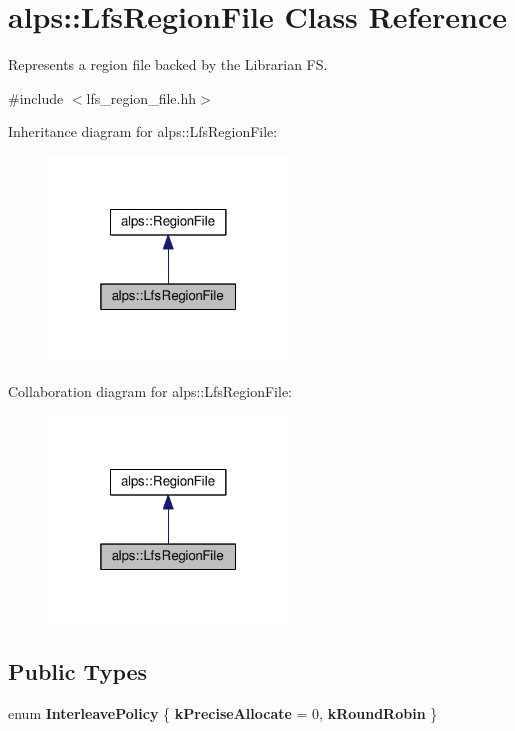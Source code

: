 \hypertarget{classalps_1_1LfsRegionFile}{}\section{alps\+:\+:Lfs\+Region\+File Class Reference}
\label{classalps_1_1LfsRegionFile}


Represents a region file backed by the Librarian FS.  




{\ttfamily \#include $<$lfs\+\_\+region\+\_\+file.\+hh$>$}



Inheritance diagram for alps\+:\+:Lfs\+Region\+File\+:
\nopagebreak
\begin{figure}[H]
\begin{center}
\leavevmode
\includegraphics[width=181pt]{classalps_1_1LfsRegionFile__inherit__graph}
\end{center}
\end{figure}


Collaboration diagram for alps\+:\+:Lfs\+Region\+File\+:
\nopagebreak
\begin{figure}[H]
\begin{center}
\leavevmode
\includegraphics[width=181pt]{classalps_1_1LfsRegionFile__coll__graph}
\end{center}
\end{figure}
\subsection*{Public Types}
\begin{DoxyCompactItemize}
\item 
enum {\bfseries Interleave\+Policy} \{ {\bfseries k\+Precise\+Allocate} = 0, 
{\bfseries k\+Round\+Robin}
 \}\hypertarget{classalps_1_1LfsRegionFile_a680a5b2fdfe08e752b30ae155901d118}{}\label{classalps_1_1LfsRegionFile_a680a5b2fdfe08e752b30ae155901d118}

\end{DoxyCompactItemize}
